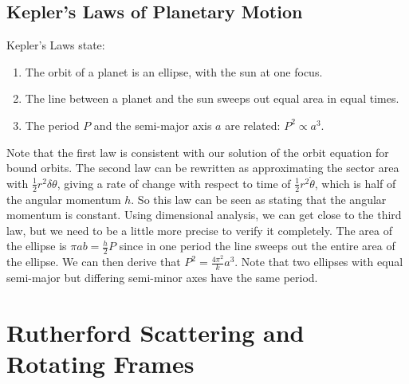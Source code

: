 \documentclass{article}
\begin{document}
\subsection{Kepler's Laws of Planetary Motion}
Kepler's Laws state:
\begin{enumerate}
    \item The orbit of a planet is an ellipse, with the sun at one focus.
    \item The line between a planet and the sun sweeps out equal area in equal times.
    \item The period $P$ and the semi-major axis $a$ are related: $P^2 \propto a^3$.
\end{enumerate}
Note that the first law is consistent with our solution of the orbit equation for bound orbits. The second law can be rewritten as approximating the sector area with $\frac{1}{2}r^2\delta\theta$, giving a rate of change with respect to time of $\frac{1}{2}r^2\dot\theta$, which is half of the angular momentum $h$. So this law can be seen as stating that the angular momentum is constant. Using dimensional analysis, we can get close to the third law, but we need to be a little more precise to verify it completely. The area of the ellipse is $\pi a b = \frac{h}{2}P$ since in one period the line sweeps out the entire area of the ellipse. We can then derive that $P^2 = \frac{4\pi^2}{k}a^3$. Note that two ellipses with equal semi-major but differing semi-minor axes have the same period.

\section{Rutherford Scattering and Rotating Frames}
\end{document}
